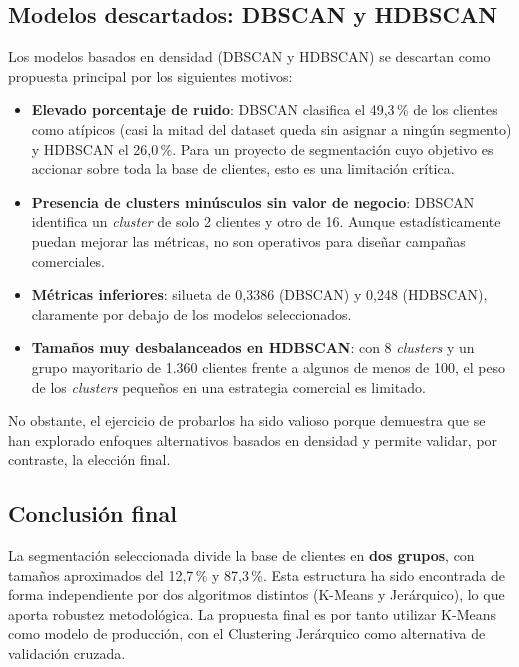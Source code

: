 \documentclass[11pt,a4paper]{article}
\begin{document}
\subsection{Modelos descartados: DBSCAN y HDBSCAN}

Los modelos basados en densidad (DBSCAN y HDBSCAN) se descartan como propuesta principal por los siguientes motivos:

\begin{itemize}
    \item \textbf{Elevado porcentaje de ruido}: DBSCAN clasifica el 49,3\,\% de los clientes como atípicos (casi la mitad del dataset queda sin asignar a ningún segmento) y HDBSCAN el 26,0\,\%. Para un proyecto de segmentación cuyo objetivo es accionar sobre toda la base de clientes, esto es una limitación crítica.
    \item \textbf{Presencia de clusters minúsculos sin valor de negocio}: DBSCAN identifica un \textit{cluster} de solo 2 clientes y otro de 16. Aunque estadísticamente puedan mejorar las métricas, no son operativos para diseñar campañas comerciales.
    \item \textbf{Métricas inferiores}: silueta de 0,3386 (DBSCAN) y 0,248 (HDBSCAN), claramente por debajo de los modelos seleccionados.
    \item \textbf{Tamaños muy desbalanceados en HDBSCAN}: con 8 \textit{clusters} y un grupo mayoritario de 1.360 clientes frente a algunos de menos de 100, el peso de los \textit{clusters} pequeños en una estrategia comercial es limitado.
\end{itemize}

No obstante, el ejercicio de probarlos ha sido valioso porque demuestra que se han explorado enfoques alternativos basados en densidad y permite validar, por contraste, la elección final.

\subsection{Conclusión final}

La segmentación seleccionada divide la base de clientes en \textbf{dos grupos}, con tamaños aproximados del 12,7\,\% y 87,3\,\%. Esta estructura ha sido encontrada de forma independiente por dos algoritmos distintos (K-Means y Jerárquico), lo que aporta robustez metodológica. La propuesta final es por tanto utilizar K-Means como modelo de producción, con el Clustering Jerárquico como alternativa de validación cruzada.


\newpage
\end{document}
